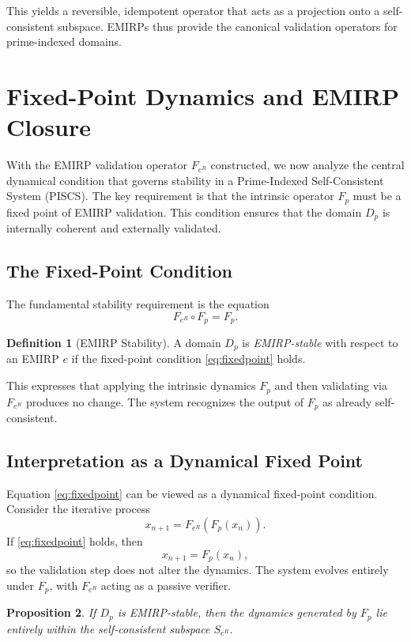 \documentclass[11pt]{article}
\theoremstyle{definition}
\newtheorem{definition}{Definition}[section]
\theoremstyle{plain}
\newtheorem{proposition}[definition]{Proposition}
\theoremstyle{remark}
\begin{document}
This yields a reversible, idempotent operator that acts as a projection
onto a self-consistent subspace. EMIRPs thus provide the canonical
validation operators for prime-indexed domains.

\section{Fixed-Point Dynamics and EMIRP Closure}

With the EMIRP validation operator $F_{e^R}$ constructed, we now analyze
the central dynamical condition that governs stability in a
Prime-Indexed Self-Consistent System (PISCS). The key requirement is
that the intrinsic operator $F_p$ must be a fixed point of EMIRP
validation. This condition ensures that the domain $D_p$ is internally
coherent and externally validated.

\subsection{The Fixed-Point Condition}

The fundamental stability requirement is the equation
\begin{equation}
\label{eq:fixedpoint}
F_{e^R} \circ F_p = F_p.
\end{equation}

\begin{definition}[EMIRP Stability]
A domain $D_p$ is \emph{EMIRP-stable} with respect to an EMIRP $e$ if
the fixed-point condition \eqref{eq:fixedpoint} holds.
\end{definition}

This expresses that applying the intrinsic dynamics $F_p$ and then
validating via $F_{e^R}$ produces no change. The system recognizes the
output of $F_p$ as already self-consistent.

\subsection{Interpretation as a Dynamical Fixed Point}

Equation \eqref{eq:fixedpoint} can be viewed as a dynamical fixed-point
condition. Consider the iterative process
\[
x_{n+1} = F_{e^R}(F_p(x_n)).
\]
If \eqref{eq:fixedpoint} holds, then
\[
x_{n+1} = F_p(x_n),
\]
so the validation step does not alter the dynamics. The system evolves
entirely under $F_p$, with $F_{e^R}$ acting as a passive verifier.

\begin{proposition}
If $D_p$ is EMIRP-stable, then the dynamics generated by $F_p$ lie
entirely within the self-consistent subspace $S_{e^R}$.
\end{proposition}
\end{document}

